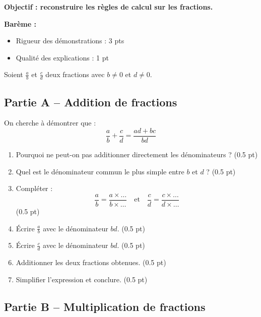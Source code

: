 \documentclass[11pt,a4paper]{article}
\begin{document}
\textbf{Objectif : reconstruire les règles de calcul sur les fractions.}

\textbf{Barème :}
\begin{itemize}
\item Rigueur des démonstrations : 3 pts
\item Qualité des explications : 1 pt
\end{itemize}

Soient $\frac{a}{b}$ et $\frac{c}{d}$ deux fractions avec $b \neq 0$ et $d \neq 0$.

\subsection*{Partie A -- Addition de fractions}

On cherche à démontrer que :
\[
\frac{a}{b} + \frac{c}{d} = \frac{ad + bc}{bd}
\]

\begin{enumerate}
\item Pourquoi ne peut-on pas additionner directement les dénominateurs ? \hfill (0.5 pt)

\item Quel est le dénominateur commun le plus simple entre $b$ et $d$ ? \hfill (0.5 pt)

\item Compléter :
\[
\frac{a}{b} = \frac{a \times \dots}{b \times \dots}
\quad \text{et} \quad
\frac{c}{d} = \frac{c \times \dots}{d \times \dots}
\] \hfill (0.5 pt)

\item Écrire $\frac{a}{b}$ avec le dénominateur $bd$. \hfill (0.5 pt)

\item Écrire $\frac{c}{d}$ avec le dénominateur $bd$. \hfill (0.5 pt)

\item Additionner les deux fractions obtenues. \hfill (0.5 pt)

\item Simplifier l’expression et conclure. \hfill (0.5 pt)

\end{enumerate}

\vspace{0.3cm}

\subsection*{Partie B -- Multiplication de fractions}
\end{document}

